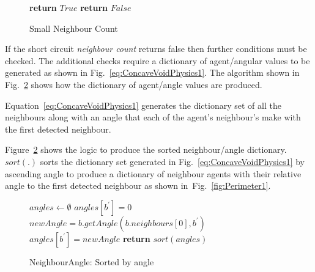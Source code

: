 \documentclass{ieeeaccess}
\begin{document}
\begin{figure}
\begin{algorithmic}[1]
{}
   \State\textbf{return} $True$
\EndIf
\State\textbf{return} $False$
\EndProcedure
\end{algorithmic}
\caption{Small Neighbour Count}
\label{algo:SmallNeighbourCount}
\end{figure}

If the short circuit \textit{neighbour count} returns false then further conditions must be checked. The additional checks require a dictionary of agent/angular values to be generated as shown in Fig.~\ref{eq:ConcaveVoidPhysics1}. The algorithm shown in Fig.~\ref{algo:getNeighbourAngles} shows how the dictionary of agent/angle values are produced.   

Equation~\ref{eq:ConcaveVoidPhysics1} generates the dictionary set of all the neighbours along with an angle that each of the agent's neighbour's make with the first detected neighbour.

Figure~\ref{algo:getNeighbourAngles} shows the logic to produce the sorted neighbour/angle dictionary. $sort(.)$ sorts the dictionary set generated in Fig.~\ref{eq:ConcaveVoidPhysics1} by ascending angle to produce a dictionary of neighbour agents with their relative angle to the first detected neighbour as shown in~Fig.~\ref{fig:Perimeter1}.

\begin{figure}
\begin{algorithmic}[1]
{}
\State $angles \leftarrow \emptyset$
  \State $angles[b^{'}] = 0$
\Else
\State $newAngle = b.getAngle(b.neighbours[0], b^{'})$
   \State $angles[b^{'}] = newAngle$
\EndIf
\EndFor
\State\textbf{return} $sort(angles)$ 
\EndProcedure
\end{algorithmic}
\caption{NeighbourAngle: Sorted by angle}
\label{algo:getNeighbourAngles}
\end{figure}
\end{document}
